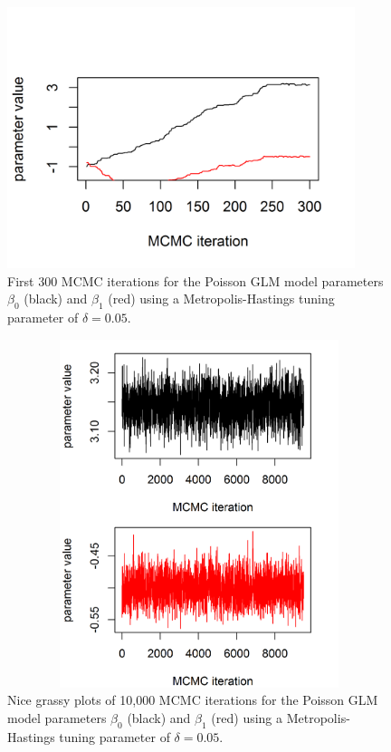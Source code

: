 \begin{figure}
\begin{center}
\includegraphics[height=3in,width=4in]{Ch2/figs/poissonmcmc2}
\end{center}
\caption{First 300 MCMC iterations for the Poisson GLM model parameters $\beta_0$ (black) and $\beta_1$ (red) using
a Metropolis-Hastings tuning parameter of
 $\delta = 0.05$.}
\label{glms.fig.poissonmcmc2}
\end{figure}

\begin{figure}
\begin{center}
\includegraphics[height=4in,width=5in]{Ch2/figs/poissonmcmc3}
\end{center}
\caption{Nice grassy plots of 10,000 MCMC iterations for the Poisson GLM model parameters $\beta_0$ (black) and $\beta_1$ (red) using
a Metropolis-Hastings tuning parameter of
 $\delta = 0.05$.}
\label{glms.fig.grassy}
\end{figure}

